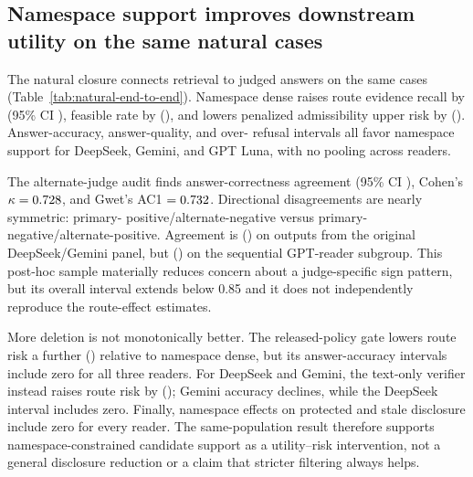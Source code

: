 \documentclass{article}
\begin{document}
\subsection{Namespace support improves downstream utility on the same natural cases}

The natural closure connects retrieval to judged answers on the same
\NaturalEndToEndCaseCount{} cases (Table~\ref{tab:natural-end-to-end}).  Namespace
dense raises route evidence recall by \NaturalEndToEndRecallDelta{} (95\% CI
\NaturalEndToEndRecallDeltaCI{}), feasible rate by
\NaturalEndToEndFeasibleDelta{} (\NaturalEndToEndFeasibleDeltaCI{}), and lowers
penalized admissibility upper risk by \NaturalEndToEndAdmRiskDelta{}
(\NaturalEndToEndAdmRiskDeltaCI{}).  Answer-accuracy, answer-quality, and over-
refusal intervals all favor namespace support for DeepSeek, Gemini, and GPT Luna,
with no pooling across readers.

The alternate-judge audit finds answer-correctness agreement
\CrossJudgeAgreement{} (95\% CI \CrossJudgeAgreementCI{}), Cohen's
$\kappa=0.728{}$, and Gwet's AC1 $=0.732{}$.  Directional
disagreements are nearly symmetric: \CrossJudgeClaudePositiveGPTNegative{} primary-
positive/alternate-negative versus \CrossJudgeClaudeNegativeGPTPositive{} primary-
negative/alternate-positive.  Agreement is \CrossJudgeOriginalPanelAgreement{}
(\CrossJudgeOriginalPanelAgreementCI{}) on outputs from the original DeepSeek/Gemini
panel, but \CrossJudgeGPTPanelAgreement{}
(\CrossJudgeGPTPanelAgreementCI{}) on the sequential GPT-reader subgroup.  This
post-hoc sample materially reduces concern about a judge-specific sign pattern, but
its overall interval extends below 0.85 and it does not independently reproduce the
route-effect estimates.

More deletion is not monotonically better.  The released-policy gate lowers route
risk a further \NaturalPolicyAdmRiskDelta{} (\NaturalPolicyAdmRiskDeltaCI{}) relative
to namespace dense, but its answer-accuracy intervals include zero for all three
readers.  For DeepSeek and Gemini, the text-only verifier instead raises route risk
by \NaturalTextVerifierAdmRiskDelta{} (\NaturalTextVerifierAdmRiskDeltaCI{});
Gemini accuracy declines, while the DeepSeek interval includes zero.  Finally,
namespace effects on protected and stale disclosure include zero for every reader.
The same-population result therefore supports namespace-constrained candidate
support as a utility--risk intervention, not a general disclosure reduction or a
claim that stricter filtering always helps.
\end{document}
